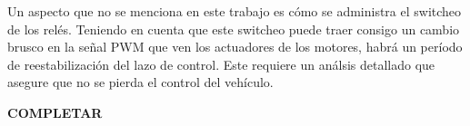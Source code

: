 Un aspecto que no se menciona en este trabajo es cómo se administra el switcheo de los relés. Teniendo en cuenta que este switcheo puede traer consigo un cambio brusco en la señal PWM que ven los actuadores de los motores, habrá un período de reestabilización del lazo de control. Este requiere un análsis detallado que asegure que no se pierda el control del vehículo.

\textbf{{\color{red} COMPLETAR}}